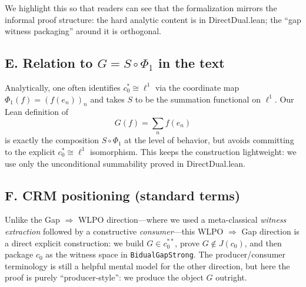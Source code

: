 \documentclass[11pt]{article}
\begin{document}
We highlight this so that readers can see that the formalization mirrors the informal proof structure: the hard analytic content is in DirectDual.lean; the ``gap witness packaging'' around it is orthogonal.

\subsection*{E. Relation to $G=S\circ\Phi_1$ in the text}

Analytically, one often identifies $c_0^\ast \cong \ell^1$ via the coordinate map $\Phi_1(f)=(f(e_n))_n$ and takes $S$ to be the summation functional on $\ell^1$. Our Lean definition of
\[G(f)=\sum_n f(e_n)\]
is exactly the composition $S\circ \Phi_1$ at the level of behavior, but avoids committing to the explicit $c_0^\ast\cong \ell^1$ isomorphism. This keeps the construction lightweight: we use only the unconditional summability proved in DirectDual.lean.

\subsection*{F. CRM positioning (standard terms)}

Unlike the Gap $\Rightarrow$ WLPO direction---where we used a meta-classical \emph{witness extraction} followed by a constructive \emph{consumer}---this WLPO $\Rightarrow$ Gap direction is a direct explicit construction: we build $G\in c_0^{**}$, prove $G\notin J(c_0)$, and then package $c_0$ as the witness space in \verb|BidualGapStrong|. The producer/consumer terminology is still a helpful mental model for the other direction, but here the proof is purely ``producer-style'': we produce the object $G$ outright.
\end{document}
